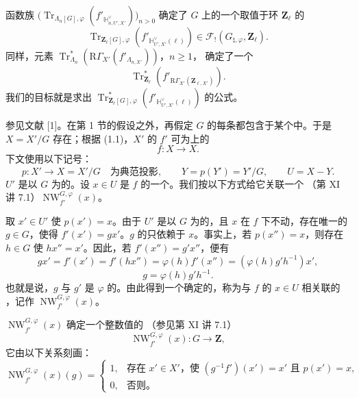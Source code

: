 函数族
$\bigl(\operatorname{Tr}_{\Lambda_n[G],\varphi}(f'_{\mathbb H_{n,U',X'}^\vee})\bigr)_{n>0}$
确定了 $G$ 上的一个取值于环 $\mathbf Z_\ell$ 的
\[
\operatorname{Tr}_{\mathbf Z_\ell[G],\varphi}
 (f'_{\mathbb H_{U',X'}^\vee(\ell)})
\in\mathscr F_!(G_{\natural,\varphi},\mathbf Z_\ell).
\]
同样，元素
$\operatorname{Tr}^{*}_{\Lambda_n}(\mathrm R\Gamma_{X'}(f'_{\Lambda_{n,X'}}))$，$n\geq1$，
确定了一个
\[
\operatorname{Tr}^{*}_{\mathbf Z_\ell}
 (f'_{\mathrm R\Gamma_{X'}(\mathbf Z_{\ell,X'})}).
\]
我们的目标就是求出
$\operatorname{Tr}^{*}_{\mathbf Z_\ell[G],\varphi}(f'_{\mathbb H_{U',X'}^\vee(\ell)})$ 的公式。

参见文献 [1]。在第 1 节的假设之外，再假定 $G$ 的每条都包含于某个中。于是 $X=X'/G$ 存在；根据 (1.1)，$X'$ 的 $f'$ 可为上的
\[
f:X\longrightarrow X.
\]
下文使用以下记号：
\[
p:X'\longrightarrow X=X'/G\quad\text{为典范投影},\qquad
Y=p(Y')=Y'/G,\qquad U=X-Y.
\]
$U'$ 是以 $G$ 为的。设 $x\in U$ 是 $f$ 的一个。我们按以下方式给它关联一个
（第 XI 讲 7.1）$\operatorname{NW}_{f'}^{G,\varphi}(x)$。

取 $x'\in U'$ 使 $p(x')=x$。由于 $U'$ 是以 $G$ 为的，且 $x$ 在 $f$ 下不动，存在唯一的 $g\in G$，使得 $f'(x')=gx'$。$g$ 的只依赖于 $x$。事实上，若 $p(x'')=x$，则存在 $h\in G$ 使 $hx''=x'$。因此，若 $f'(x'')=g'x''$，便有
\[
gx'=f'(x')=f'(hx'')=\varphi(h)f'(x'')=(\varphi(h)g'h^{-1})x',
\]
\[
g=\varphi(h)g'h^{-1}.
\]
也就是说，$g$ 与 $g'$ 是 $\varphi$ 的。由此得到一个确定的，称为与 $f$ 的 $x\in U$ 相关联的
，记作 $\operatorname{NW}_{f'}^{G,\varphi}(x)$。

 $\operatorname{NW}_{f'}^{G,\varphi}(x)$ 确定一个整数值的
（参见第 XI 讲 7.1）
\[
\operatorname{NW}_{f'}^{G,\varphi}(x):G\longrightarrow\mathbf Z,
\]
它由以下关系刻画：
\[
\operatorname{NW}_{f'}^{G,\varphi}(x)(g)=
\begin{cases}
1,&\text{存在 }x'\in X'\text{，使 }(g^{-1}f')(x')=x'\text{ 且 }p(x')=x,\\
0,&\text{否则。}
\end{cases}
\tag{3.1}
\]

